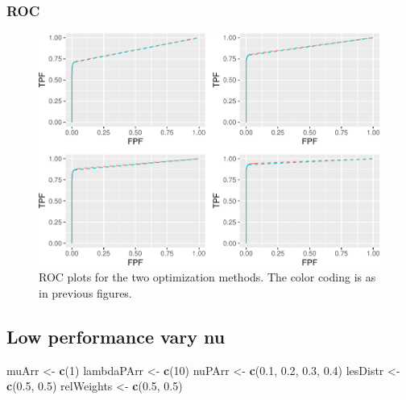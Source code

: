 \documentclass[
]{book}
\newenvironment{Shaded}{\begin{snugshade}}{\end{snugshade}}
\newcommand{\DecValTok}[1]{\textcolor[rgb]{0.00,0.00,0.81}{#1}}
\newcommand{\FloatTok}[1]{\textcolor[rgb]{0.00,0.00,0.81}{#1}}
\newcommand{\KeywordTok}[1]{\textcolor[rgb]{0.13,0.29,0.53}{\textbf{#1}}}
\newcommand{\NormalTok}[1]{#1}
\newcommand{\StringTok}[1]{\textcolor[rgb]{0.31,0.60,0.02}{#1}}
\begin{document}
\hypertarget{roc-9}{%
\subsubsection{ROC}\label{roc-9}}

\begin{figure}
\centering
\includegraphics{22-optim-op-point_files/figure-latex/optim-op-point-high-performance-vary-nu-vary-all-roc-1.pdf}
\caption{\label{fig:optim-op-point-high-performance-vary-nu-vary-all-roc}ROC plots for the two optimization methods. The color coding is as in previous figures.}
\end{figure}

\hypertarget{optim-op-point-low-performance-vary-nu}{%
\subsection{Low performance vary nu}\label{optim-op-point-low-performance-vary-nu}}

\begin{Shaded}
\begin{Highlighting}[]
\NormalTok{muArr <-}\StringTok{ }\KeywordTok{c}\NormalTok{(}\DecValTok{1}\NormalTok{)}
\NormalTok{lambdaPArr <-}\StringTok{ }\KeywordTok{c}\NormalTok{(}\DecValTok{10}\NormalTok{)}
\NormalTok{nuPArr <-}\StringTok{ }\KeywordTok{c}\NormalTok{(}\FloatTok{0.1}\NormalTok{, }\FloatTok{0.2}\NormalTok{, }\FloatTok{0.3}\NormalTok{, }\FloatTok{0.4}\NormalTok{)}
\NormalTok{lesDistr <-}\StringTok{ }\KeywordTok{c}\NormalTok{(}\FloatTok{0.5}\NormalTok{, }\FloatTok{0.5}\NormalTok{)}
\NormalTok{relWeights <-}\StringTok{ }\KeywordTok{c}\NormalTok{(}\FloatTok{0.5}\NormalTok{, }\FloatTok{0.5}\NormalTok{)}
\end{Highlighting}
\end{Shaded}
\end{document}
